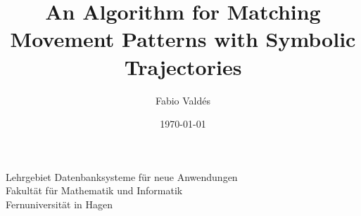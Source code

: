 \documentclass[a4paper]{article}
\title{An Algorithm for Matching Movement Patterns with Symbolic Trajectories}
\author{Fabio Vald\'es}
\date{\today}
\begin{document}
\maketitle

\thispagestyle{empty}
\begin{center}
Lehrgebiet Datenbanksysteme für neue Anwendungen \\
Fakultät für Mathematik und Informatik \\
Fernuniversität in Hagen \\

\end{center}
\setcounter{page}{0}


\begin{appendix}

\end{appendix}
\end{document}
